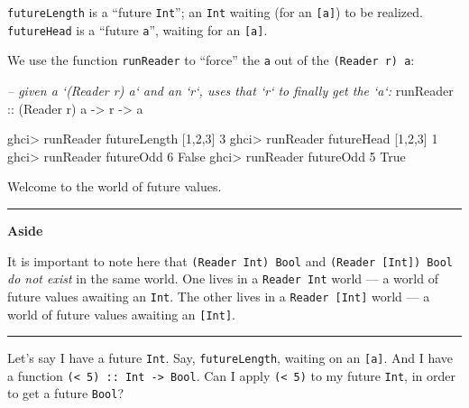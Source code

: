 \documentclass[]{article}
\newenvironment{Shaded}{}{}
\newcommand{\CommentTok}[1]{\textcolor[rgb]{0.38,0.63,0.69}{\textit{#1}}}
\newcommand{\DataTypeTok}[1]{\textcolor[rgb]{0.56,0.13,0.00}{#1}}
\newcommand{\DecValTok}[1]{\textcolor[rgb]{0.25,0.63,0.44}{#1}}
\newcommand{\FunctionTok}[1]{\textcolor[rgb]{0.02,0.16,0.49}{#1}}
\newcommand{\NormalTok}[1]{#1}
\newcommand{\OtherTok}[1]{\textcolor[rgb]{0.00,0.44,0.13}{#1}}
\begin{document}
\texttt{futureLength} is a ``future \texttt{Int}''; an \texttt{Int} waiting (for
an \texttt{{[}a{]}}) to be realized. \texttt{futureHead} is a ``future
\texttt{a}'', waiting for an \texttt{{[}a{]}}.

We use the function \texttt{runReader} to ``force'' the \texttt{a} out of the
\texttt{(Reader\ r)\ a}:

\begin{Shaded}
\begin{Highlighting}[]
\CommentTok{-- given a `(Reader r) a` and an `r`, uses that `r` to finally get the `a`:}
\OtherTok{runReader ::}\NormalTok{ (}\DataTypeTok{Reader}\NormalTok{ r) a }\OtherTok{->}\NormalTok{ r }\OtherTok{->}\NormalTok{ a}
\end{Highlighting}
\end{Shaded}

\begin{Shaded}
\begin{Highlighting}[]
\NormalTok{ghci}\FunctionTok{>}\NormalTok{ runReader futureLength [}\DecValTok{1}\NormalTok{,}\DecValTok{2}\NormalTok{,}\DecValTok{3}\NormalTok{]}
\DecValTok{3}
\NormalTok{ghci}\FunctionTok{>}\NormalTok{ runReader futureHead [}\DecValTok{1}\NormalTok{,}\DecValTok{2}\NormalTok{,}\DecValTok{3}\NormalTok{]}
\DecValTok{1}
\NormalTok{ghci}\FunctionTok{>}\NormalTok{ runReader futureOdd }\DecValTok{6}
\DataTypeTok{False}
\NormalTok{ghci}\FunctionTok{>}\NormalTok{ runReader futureOdd }\DecValTok{5}
\DataTypeTok{True}
\end{Highlighting}
\end{Shaded}

Welcome to the world of future values.

\begin{center}\rule{0.5\linewidth}{\linethickness}\end{center}

\textbf{Aside}

It is important to note here that \texttt{(Reader\ Int)\ Bool} and
\texttt{(Reader\ {[}Int{]})\ Bool} \emph{do not exist} in the same world. One
lives in a \texttt{Reader\ Int} world --- a world of future values awaiting an
\texttt{Int}. The other lives in a \texttt{Reader\ {[}Int{]}} world --- a world
of future values awaiting an \texttt{{[}Int{]}}.

\begin{center}\rule{0.5\linewidth}{\linethickness}\end{center}

Let's say I have a future \texttt{Int}. Say, \texttt{futureLength}, waiting on
an \texttt{{[}a{]}}. And I have a function
\texttt{(\textless{}\ 5)\ ::\ Int\ -\textgreater{}\ Bool}. Can I apply
\texttt{(\textless{}\ 5)} to my future \texttt{Int}, in order to get a future
\texttt{Bool}?
\end{document}
